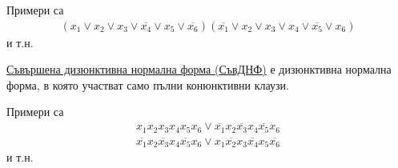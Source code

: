 \begin{example}
    Примери са 
    \begin{align*}
        (x_1 \vee x_2 \vee x_3 \vee \overline{x_4} \vee x_5 \vee \overline{x_6})(\overline{x_1} \vee x_2 
        \vee x_3 \vee x_4 \vee \overline{x_5} \vee x_6)
    \end{align*} и т.н.
\end{example}

\begin{definition}
    \underline{Съвършена дизюнктивна нормална форма (СъвДНФ)} е дизюнктивна нормална форма, в която 
    участват само пълни конюнктивни клаузи.
\end{definition}

\begin{example}
    Примери са 
    \begin{align*}
        x_1x_2x_3x_4x_5x_6 \vee \overline{x_1}x_2\overline{x_3}x_4\overline{x_5}x_6 \\
        \overline{x_1}x_2\overline{x_3}x_4\overline{x_5}x_6 \vee x_1\overline{x_2}x_3\overline{x_4}x_5\overline{x_6}
    \end{align*} и т.н.
\end{example}


